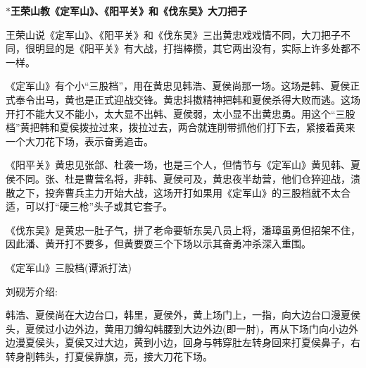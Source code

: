 {







}
\vspace{15pt}
$\ast${\bfseries\hwfs 王荣山教《定军山》、《阳平关》和《伐东吴》大刀把子}

王荣山说《定军山》、《阳平关》和《伐东吴》三出黄忠戏戏情不同，大刀把子不同，很明显的是《阳平关》有大战，打挡棒攒，其它两出没有，实际上许多处都不一样。

《定军山》有个小``三股档''，用在黄忠见韩浩、夏侯尚那一场。这场是韩、夏侯正式奉令出马，黄也是正式迎战交锋。黄忠抖擞精神把韩和夏侯杀得大败而逃。这场开打不能大又不能小，太大显不出韩、夏侯弱，太小显不出黄忠勇。用这个``三股档''黄把韩和夏侯拨拉过来，拨拉过去，两合就连削带抓他们打下去，紧接着黄来一个大刀花下场，表示奋勇追击。

《阳平关》黄忠见张郃、杜袭一场，也是三个人，但情节与《定军山》黄见韩、夏侯不同。张、杜是曹营名将，非韩、夏侯可及，黄忠夜半劫营，他们仓猝迎战，溃散之下，投奔曹兵主力开始大战，这场开打如果用《定军山》的三股档就不太合适，可以打``硬三枪''头子或其它套子。

《伐东吴》是黄忠一肚子气，拼了老命要斩东吴八员上将，潘璋虽勇但招架不住，因此潘、黄开打不要多，但黄要耍三个下场以示其奋勇冲杀深入重围。

《定军山》三股档(谭派打法)

{\hei 刘砚芳介绍}:~

韩浩、夏侯尚在大边台口，韩里，夏侯外，黄上场门上，一指，向大边台口漫夏侯头，夏侯过小边外边，黄用刀鐏勾韩腰到大边外边(即一肘)，再从下场门向小边外边漫夏侯头，夏侯又过大边，黄到小边，回身与韩穿肚左转身回来打夏侯鼻子，右转身削韩头，打夏侯靠旗，亮，接大刀花下场。

